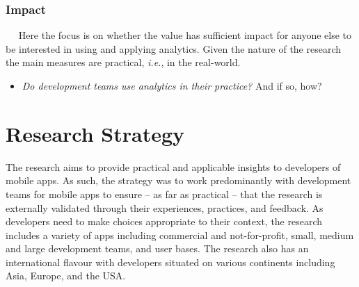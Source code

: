 \subsubsection{Impact}~\label{section-impact}~\label{sec:impact}
Here the focus is on whether the value has sufficient impact for anyone else to be interested in using and applying analytics. Given the nature of the research the main measures are practical, \emph{i.e.}, in the real-world.
\begin{itemize}
    \item \emph{Do development teams use analytics in their practice?}  And if so, how? %
\end{itemize}


\section{Research Strategy}
The research aims to provide practical and applicable insights to developers of mobile apps. As such, the strategy was to work predominantly with development teams for mobile apps to ensure -- as far as practical -- that the research is externally validated through their experiences, practices, and feedback. As developers need to make choices appropriate to their context, the research includes a variety of apps including commercial and not-for-profit, small, medium and large development teams, and user bases. The research also has an international flavour with developers situated on various continents including Asia, Europe, and the USA.

